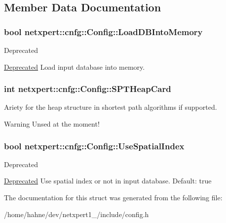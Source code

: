 \subsection{Member Data Documentation}
\subsubsection[{\texorpdfstring{Load\+D\+B\+Into\+Memory}{LoadDBIntoMemory}}]{\setlength{\rightskip}{0pt plus 5cm}bool netxpert\+::cnfg\+::\+Config\+::\+Load\+D\+B\+Into\+Memory}\hypertarget{structnetxpert_1_1cnfg_1_1Config_ac94abe7cd836323220db9e8f7ac674df}{}\label{structnetxpert_1_1cnfg_1_1Config_ac94abe7cd836323220db9e8f7ac674df}
\begin{DoxyRefDesc}{Deprecated}
\item[\hyperlink{deprecated__deprecated000002}{Deprecated}]Load input database into memory. \end{DoxyRefDesc}
\subsubsection[{\texorpdfstring{S\+P\+T\+Heap\+Card}{SPTHeapCard}}]{\setlength{\rightskip}{0pt plus 5cm}int netxpert\+::cnfg\+::\+Config\+::\+S\+P\+T\+Heap\+Card}\hypertarget{structnetxpert_1_1cnfg_1_1Config_a41afc9fb4f15155eec2f8c30eaae5500}{}\label{structnetxpert_1_1cnfg_1_1Config_a41afc9fb4f15155eec2f8c30eaae5500}


Ariety for the heap structure in shortest path algorithms if supported. 

\begin{DoxyWarning}{Warning}
Unsed at the moment! 
\end{DoxyWarning}
\subsubsection[{\texorpdfstring{Use\+Spatial\+Index}{UseSpatialIndex}}]{\setlength{\rightskip}{0pt plus 5cm}bool netxpert\+::cnfg\+::\+Config\+::\+Use\+Spatial\+Index}\hypertarget{structnetxpert_1_1cnfg_1_1Config_a415b76b1b41d24dc3b4cf11b9021f366}{}\label{structnetxpert_1_1cnfg_1_1Config_a415b76b1b41d24dc3b4cf11b9021f366}
\begin{DoxyRefDesc}{Deprecated}
\item[\hyperlink{deprecated__deprecated000001}{Deprecated}]Use spatial index or not in input database. Default\+: true \end{DoxyRefDesc}


The documentation for this struct was generated from the following file\+:\begin{DoxyCompactItemize}
\item 
/home/hahne/dev/netxpert1\+\_/include/config.\+h\end{DoxyCompactItemize}
